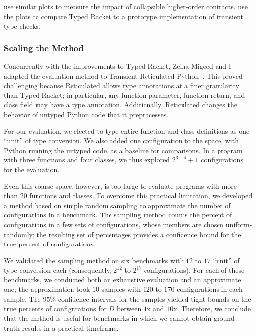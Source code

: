 \citet{fgsfs-oopsla-2018} use similar plots to measure the impact of
 collapsible higher-order contracts.
\citet{gf-icfp-2018} use the plots to compare Typed Racket to a prototype
 implementation of transient type checks.


\subsubsection{Scaling the Method}




Concurrently with the improvements to Typed Racket, Zeina Migeed and I
 adapted the evaluation method to Transient Reticulated Python~\cite{gm-pepm-2018}.
This proved challenging because Reticulated allows type annotations
 at a finer granularity than Typed Racket; in particular, any function
 parameter, function return, and class field may have a type annotation.
Additionally, Reticulated changes the behavior of untyped Python code that
 it preprocesses.

For our evaluation, we elected to type entire function and class definitions
 as one ``unit'' of type conversion.
We also added one configuration to the space, with Python running the untyped
 code, as a baseline for comparisons.
In a program with three functions and four classes, we thus explored
 $2^{3+4} + 1$ configurations for the evaluation.

Even this coarse space, however, is too large to evaluate programs with more
 than $20$ functions and classes.
To overcome this practical limitation, we developed a method based on
 simple random sampling to approximate the number of 
 configurations in a benchmark.
The sampling method counts the percent of  configurations
 in a few sets of configurations, whose members are chosen uniform-randomly;
 the resulting set of percentages provides a confidence bound for the true
 percent of  configurations.

We validated the sampling method on six benchmarks with $12$ to $17$ ``unit''
 of type conversion each (consequently, $2^{12}$ to $2^{17}$ configurations).
For each of these benchmarks, we conducted both an exhaustive evaluation and
 an approximate one; the approximation took $10$ samples with $120$ to $170$
 configurations in each sample.
The $95$\% confidence intervals for the samples yielded tight bounds on the
 true percents of  configurations for $D$ between $1$x and
 $10$x.
Therefore, we conclude that the method is useful for benchmarks in which we
 cannot obtain ground-truth results in a practical timeframe.


